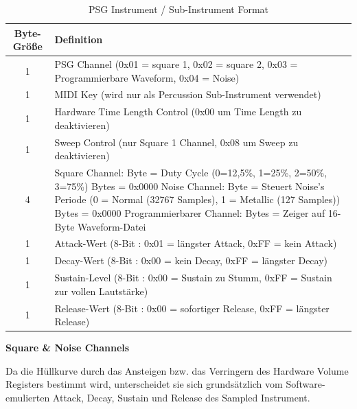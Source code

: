 \documentclass[11pt,a4paper]{scrartcl}
\newcommand{\paratitle}[1] {
    \vspace{5mm}
    \large \textbf{#1} \normalsize
    \vspace{2mm}\newline
}
\begin{document}
\begin{table}[h]
    \centering
    \begin{tabular}{ c | p{15cm} }
        \textbf{Byte-Gr\"o{\ss}e} & \textbf{Definition} \\
        \hline
        1 & PSG Channel (0x01 = square 1, 0x02 = square 2, 0x03 = Programmierbare Waveform, 0x04 = Noise) \\
        \hline
        1 & MIDI Key (wird nur als Percussion Sub-Instrument verwendet)\\
        \hline
        1 & Hardware Time Length Control (0x00 um Time Length zu deaktivieren)\\
        \hline
        1 & Sweep Control (nur Square 1 Channel, 0x08 um Sweep zu deaktivieren) \\
        \hline
        4 & Square Channel:\newline
        1 Byte = Duty Cycle (0=12,5\%, 1=25\%, 2=50\%, 3=75\%)\newline
        3 Bytes = 0x0000\newline
        Noise Channel:\newline	
        1 Byte = Steuert Noise's Periode (0 = Normal (32767 Samples), 1 = Metallic (127 Samples)) \newline
        3 Bytes = 0x0000\newline
        Programmierbarer Channel:\newline
        4 Bytes = Zeiger auf 16-Byte Waveform-Datei \\
        \hline
        1 & Attack-Wert (8-Bit : 0x01 = l\"angster Attack, 0xFF = kein Attack)\\
        \hline
        1 & Decay-Wert (8-Bit : 0x00 = kein Decay, 0xFF = l\"angster Decay) \\
        \hline
        1 & Sustain-Level (8-Bit : 0x00 = Sustain zu Stumm, 0xFF = Sustain zur vollen Lautst\"arke) \\
        \hline
        1 & Release-Wert (8-Bit : 0x00 = sofortiger Release, 0xFF = l\"angster Release) \\
    \end{tabular}
    \caption{PSG Instrument / Sub-Instrument Format}
    \label{table:PSGInstrument}
\end{table}
\vspace{-5pt}

\paratitle{Square \& Noise Channels}
Da die H\"ullkurve durch das Ansteigen bzw. das Verringern des Hardware Volume Registers bestimmt wird, unterscheidet sie sich grunds\"atzlich vom Software-emulierten Attack, Decay, Sustain und Release des Sampled Instrument.
\end{document}
